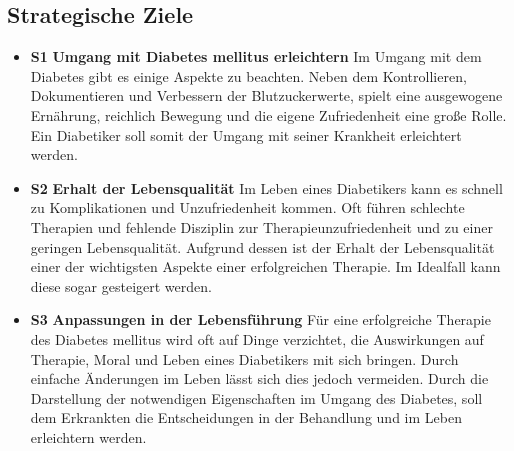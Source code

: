 \documentclass[a4paper,11pt]{article}%
\renewcommand{\\}{\vspace*{0.5\baselineskip} \newline}
\begin{document}
\subsection{Strategische Ziele}
\begin{itemize}
	\item \lbrack \textbf{S1}\rbrack  \textbf{ Umgang mit Diabetes mellitus erleichtern}\\
	Im Umgang mit dem Diabetes gibt es einige Aspekte zu beachten. Neben dem Kontrollieren, Dokumentieren und Verbessern der Blutzuckerwerte, spielt eine ausgewogene Ernährung, reichlich Bewegung und die eigene Zufriedenheit eine große Rolle. Ein Diabetiker soll somit der Umgang mit seiner Krankheit erleichtert werden. \\
	\item \lbrack \textbf{S2}\rbrack  \textbf{ Erhalt der Lebensqualität}\\
	Im Leben eines Diabetikers kann es schnell zu Komplikationen und Unzufriedenheit kommen. Oft führen schlechte Therapien und fehlende Disziplin zur Therapieunzufriedenheit und zu einer geringen Lebensqualität. Aufgrund dessen ist der Erhalt der Lebensqualität einer der wichtigsten Aspekte einer erfolgreichen Therapie. Im Idealfall kann diese sogar gesteigert werden. \\
	\item \lbrack \textbf{S3}\rbrack  \textbf{ Anpassungen in der Lebensführung} \\
	Für eine erfolgreiche Therapie des Diabetes mellitus wird oft auf Dinge verzichtet, die Auswirkungen auf Therapie, Moral und Leben eines Diabetikers mit sich bringen. Durch einfache Änderungen im Leben lässt sich dies jedoch vermeiden.  Durch die Darstellung der notwendigen Eigenschaften im Umgang des Diabetes, soll dem Erkrankten die Entscheidungen in der Behandlung und im Leben erleichtern werden. \\

\end{itemize}
\end{document}
